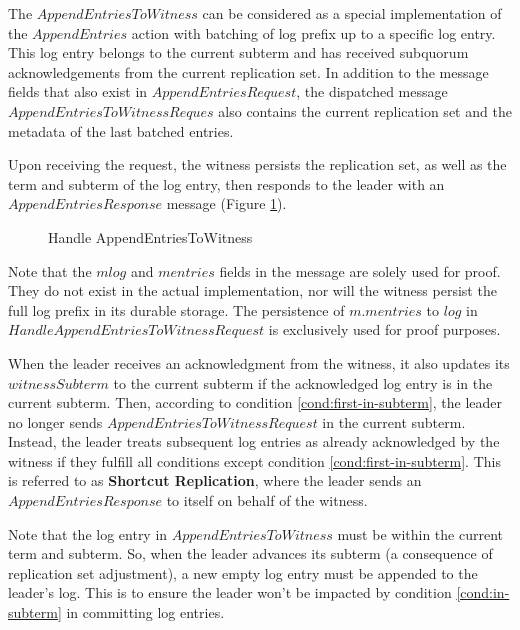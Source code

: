 The $AppendEntriesToWitness$ can be considered as a special implementation of the $AppendEntries$ action with batching of log prefix up to a specific log entry. This log entry belongs to the current subterm and has received subquorum acknowledgements from the current replication set. In addition to the message fields that also exist in $AppendEntriesRequest$, the dispatched message $AppendEntriesToWitnessReques$ also contains the current replication set and the metadata of the last batched entries.

Upon receiving the request, the witness persists the replication set, as well as the term and subterm of the log entry, then responds to the leader with an $AppendEntriesResponse$ message (Figure \ref{fig:handle-append-entries-to-witness}). 

\begin{figure}
    \begin{framed}
        
    \end{framed}
    \caption{Handle AppendEntriesToWitness}
    \label{fig:handle-append-entries-to-witness}
\end{figure}

Note that the $mlog$ and $mentries$ fields in the message are solely used for proof. They do not exist in the actual implementation, nor will the witness persist the full log prefix in its durable storage. The persistence of $m.mentries$ to $log$ in $HandleAppendEntriesToWitnessRequest$ is exclusively used for proof purposes.

When the leader receives an acknowledgment from the witness, it also updates its $witnessSubterm$ to the current subterm if the acknowledged log entry is in the current subterm. Then, according to condition \ref{cond:first-in-subterm}, the leader no longer sends $AppendEntriesToWitnessRequest$ in the current subterm. Instead, the leader treats subsequent log entries as already acknowledged by the witness if they fulfill all conditions except condition \ref{cond:first-in-subterm}. This is referred to as \textbf{Shortcut Replication}, where the leader sends an $AppendEntriesResponse$ to itself on behalf of the witness.

Note that the log entry in $AppendEntriesToWitness$ must be within the current term and subterm. So, when the leader advances its subterm (a consequence of replication set adjustment), a new empty log entry must be appended to the leader's log. This is to ensure the leader won't be impacted by condition \ref{cond:in-subterm} in committing log entries.

